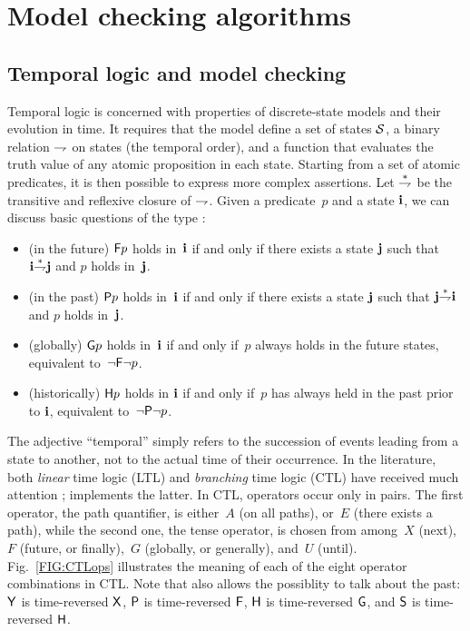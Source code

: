 %
%

\chapter{Model checking algorithms} \label{SEC:ModelChecking}

\section{Temporal logic and model checking}

Temporal logic is concerned with properties of discrete-state models and
their evolution in time. It requires that the model define a set of states
$\mathcal{S}$, a binary relation ${\stackrel{~}{\rightharpoondown}}$ on states (the temporal order),
and a function that evaluates the truth value of any atomic proposition in
each state. Starting from a set of atomic predicates, it is then possible
to express more complex assertions. Let ${\stackrel{*}{\rightharpoondown}}$ be the transitive and
reflexive closure of ${\stackrel{~}{\rightharpoondown}}$.
Given a predicate~$p$ and a state $\mathbf{i}$,
we can discuss basic questions of the type :

\begin{itemize}
\item
(in the future) $\mathsf{F}{}p$ holds in~$\mathbf{i}$ if and only if there exists a state $\mathbf{j}$
such that $\mathbf{i} {\stackrel{*}{\rightharpoondown}} \mathbf{j}$ and $p$ holds in~$\mathbf{j}$.
\item
(in the past) $\mathsf{P}{}p$ holds in~$\mathbf{i}$ if and only if there exists a state $\mathbf{j}$
such that $\mathbf{j} {\stackrel{*}{\rightharpoondown}} \mathbf{i}$ and $p$ holds in~$\mathbf{j}$.
\item
(globally) $\mathsf{G}{}p$ holds in~$\mathbf{i} $ if and only if~$p$ always holds in
the future states, equivalent to~$\neg\mathsf{F}{}\neg p$.
\item
(historically) $\mathsf{H}{}p$ holds in $\mathbf{i}$ if and only if~$p$ has always held in
the past prior to $\mathbf{i}$, equivalent to~$\neg\mathsf{P}{}\neg p$.
\end{itemize}

The adjective ``temporal'' simply refers to the succession of events
leading from a state to another, not to the actual time of their
occurrence. In the literature, both \emph{linear} time logic (LTL) and
\emph{branching} time logic (CTL) have received much attention
\cite{Clarke1999book,McMillan1992thesis};
{\smart} implements the latter. In CTL, operators
occur only in pairs.  The first operator, the path quantifier, is
either~$A$ (on all paths), or~$E$ (there exists a path), while the second
one, the tense operator, is chosen from among~$X$ (next),~$F$ (future, or
finally),~$G$ (globally, or generally), and~$U$ (until). 
Fig.~\ref{FIG:CTLops} illustrates the meaning of each of the eight operator
combinations in CTL.
Note that {\smart} also allows the possiblity to talk about the past:
$\mathsf{Y}$ is time-reversed $\mathsf{X}$,
$\mathsf{P}$ is time-reversed $\mathsf{F}$,
$\mathsf{H}$ is time-reversed $\mathsf{G}$,
and 
$\mathsf{S}$ is time-reversed $\mathsf{H}$.


